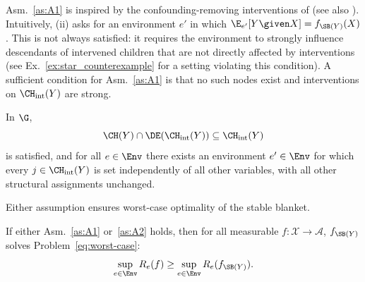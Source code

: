 Asm.~\ref{as:A1} is inspired by the confounding-removing interventions of \citet{christiansenCausalFrameworkDistribution2021} (see also \citealp{saengkyongamInvariantPolicyLearning2022}). Intuitively, (ii) asks for an environment $e'$ in which $\E_{e'}[Y \given X] = f_{\SB(Y)}(X)$.
This 
is not always satisfied:
it requires the environment to strongly
influence descendants of intervened children that are not directly 
affected 
by interventions
(see Ex.~\ref{ex:star_counterexample} for a setting violating this condition). 
A sufficient condition for Asm.~\ref{as:A1} is that
no such nodes exist and interventions on $\CH_\mathrm{int}(Y)$ are strong.
\begin{assumption} \label{as:A2} 
In $\G$,
\begin{equation} \label{eq:star}
    \CH(Y) \cap \DE(\CH_\mathrm{int}(Y)) \subseteq \CH_\mathrm{int}(Y)
\end{equation}
is satisfied, and for all $e \in \Env$ there exists an environment $e' \in \Env$ for which every $j \in \CH_\mathrm{int}(Y)$ is set independently of all other variables, with all other structural assignments unchanged.
\end{assumption}
Either assumption ensures worst-case optimality of the stable blanket.
\begin{theorem} \label{thm:worst_case}
If either Asm.~\ref{as:A1} or~\ref{as:A2} holds, then for all
measurable $f\colon \mathcal{X}\to\mathcal{A}$, $f_{\SB(Y)}$ solves Problem~\eqref{eq:worst-case}:
\begin{equation} \label{eq:worst_case_statement}
    \sup_{e \in \Env} R_e(f) \geq \sup_{e \in \Env} R_e(f_{\SB(Y)}).
\end{equation}
\end{theorem}

